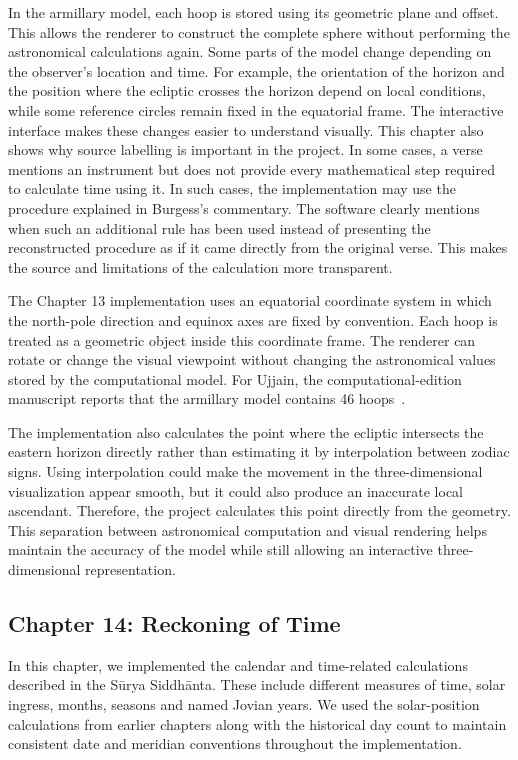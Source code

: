 \documentclass[12pt,a4paper,oneside]{report}
\newcommand{\surya}{Sūrya Siddhānta\xspace}
\begin{document}
In the armillary model, each hoop is stored using its geometric plane and offset. This allows the renderer to construct the complete sphere without performing the astronomical calculations again. Some parts of the model change depending on the observer's location and time. For example, the orientation of the horizon and the position where the ecliptic crosses the horizon depend on local conditions, while some reference circles remain fixed in the equatorial frame. The interactive interface makes these changes easier to understand visually. This chapter also shows why source labelling is important in the project. In some cases, a verse mentions an instrument but does not provide every mathematical step required to calculate time using it. In such cases, the implementation may use the procedure explained in Burgess's commentary. The software clearly mentions when such an additional rule has been used instead of presenting the reconstructed procedure as if it came directly from the original verse. This makes the source and limitations of the calculation more transparent.

The Chapter 13 implementation uses an equatorial coordinate system in which the north-pole direction and equinox axes are fixed by convention. Each hoop is treated as a geometric object inside this coordinate frame. The renderer can rotate or change the visual viewpoint without changing the astronomical values stored by the computational model. For Ujjain, the computational-edition manuscript reports that the armillary model contains 46 hoops~\cite{nigam2026edition}.

The implementation also calculates the point where the ecliptic intersects the eastern horizon directly rather than estimating it by interpolation between zodiac signs. Using interpolation could make the movement in the three-dimensional visualization appear smooth, but it could also produce an inaccurate local ascendant. Therefore, the project calculates this point directly from the geometry. This separation between astronomical computation and visual rendering helps maintain the accuracy of the model while still allowing an interactive three-dimensional representation.

\subsection{Chapter 14: Reckoning of Time}

In this chapter, we implemented the calendar and time-related calculations described in the \surya. These include different measures of time, solar ingress, months, seasons and named Jovian years. We used the solar-position calculations from earlier chapters along with the historical day count to maintain consistent date and meridian conventions throughout the implementation.
\end{document}
